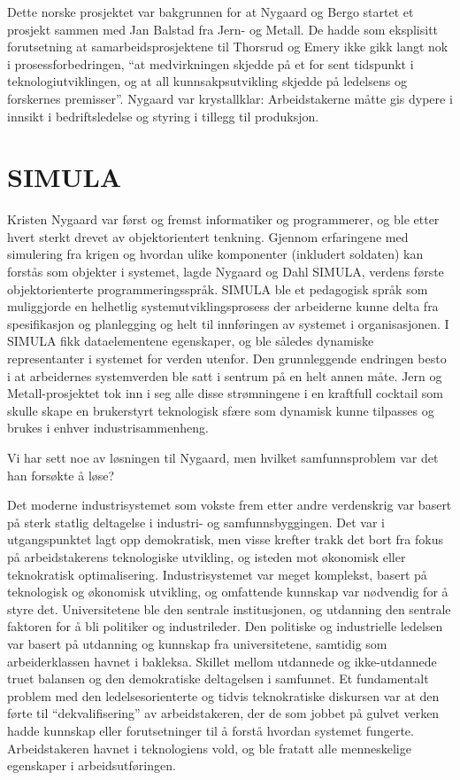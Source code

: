Dette norske prosjektet var bakgrunnen for at Nygaard og Bergo startet et prosjekt sammen med Jan Balstad fra Jern- og Metall. De hadde som eksplisitt forutsetning at samarbeidsprosjektene til Thorsrud og Emery ikke gikk langt nok i prosessforbedringen, ``at medvirkningen skjedde på et for sent tidspunkt i teknologiutviklingen, og at all kunnsakpsutvikling skjedde på ledelsens og forskernes premisser''. Nygaard var krystallklar: Arbeidstakerne måtte gis dypere i innsikt i bedriftsledelse og styring i tillegg til produksjon.

\section{SIMULA}

Kristen Nygaard var først og fremst informatiker og programmerer, og ble etter hvert sterkt drevet av objektorientert tenkning. Gjennom erfaringene med simulering fra krigen og hvordan ulike komponenter (inkludert soldaten) kan forstås som objekter i systemet, lagde Nygaard og Dahl SIMULA, verdens første objektorienterte programmeringsspråk. SIMULA ble et pedagogisk språk som muliggjorde en helhetlig systemutviklingsprosess der arbeiderne kunne delta fra spesifikasjon og planlegging og helt til innføringen av systemet i organisasjonen. I SIMULA fikk dataelementene egenskaper, og ble således dynamiske representanter i systemet for verden utenfor. Den grunnleggende endringen besto i at arbeidernes systemverden ble satt i sentrum på en helt annen måte. Jern og Metall-prosjektet tok inn i seg alle disse strømningene i en kraftfull cocktail som skulle skape en brukerstyrt teknologisk sfære som dynamisk kunne tilpasses og brukes i enhver industrisammenheng.

Vi har sett noe av løsningen til Nygaard, men hvilket samfunnsproblem var det han forsøkte å løse?

Det moderne industrisystemet som vokste frem etter andre verdenskrig var basert på sterk statlig deltagelse i industri- og samfunnsbyggingen. Det var i utgangspunktet lagt opp demokratisk, men visse krefter trakk det bort fra fokus på arbeidstakerens teknologiske utvikling, og isteden mot økonomisk eller teknokratisk optimalisering. Industrisystemet var meget komplekst, basert på teknologisk og økonomisk utvikling, og omfattende kunnskap var nødvendig for å styre det. Universitetene ble den sentrale institusjonen, og utdanning den sentrale faktoren for å bli politiker og industrileder. Den politiske og industrielle ledelsen var basert på utdanning og kunnskap fra universitetene, samtidig som arbeiderklassen havnet i bakleksa. Skillet mellom utdannede og ikke-utdannede truet balansen og den demokratiske deltagelsen i samfunnet. Et fundamentalt problem med den ledelsesorienterte og tidvis teknokratiske diskursen var at den førte til ``dekvalifisering'' av arbeidstakeren, der de som jobbet på gulvet verken hadde kunnskap eller forutsetninger til å forstå hvordan systemet fungerte. Arbeidstakeren havnet i teknologiens vold, og ble fratatt alle menneskelige egenskaper i arbeidsutføringen.

